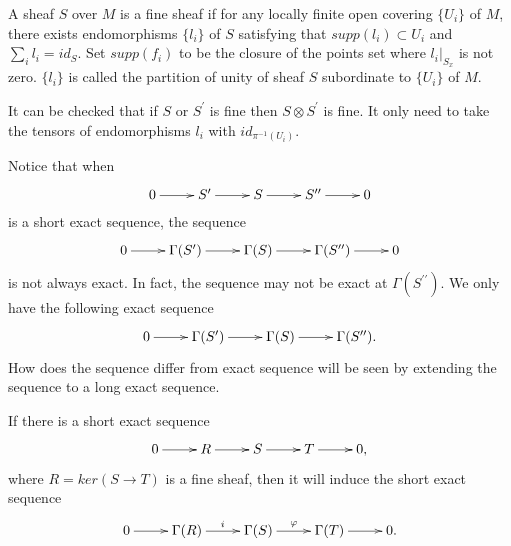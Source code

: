 \documentclass[twoside]{article}
\begin{document}
\begin{definition}
  A sheaf $S$ over $M$ is a fine sheaf if for any locally finite  open covering $\{U_i\}$ of $M$, there exists endomorphisms $\{l_i\}$   of $S$ satisfying that $supp(l_i)\subset U_i$ and $\sum_i l_i=id_S$. Set $supp(f_i)$ to be the closure of the points set where $l_i|_{S_x}$ is not zero. $\{l_i\}$ is called the partition of unity of sheaf $S$ subordinate to $\{U_i\}$ of $M$.

\end{definition}

It can be checked  that if $S$ or $S^\prime$ is fine then $S\otimes S^\prime$ is fine. It only need to  take the tensors of  endomorphisms $l_i$ with $id_{\pi^{-1}(U_i)}$.


Notice that when
\begin{equation*}
  \xymatrix{
  0\ar[r]&S^\prime\ar[r]&S\ar[r]&S^{\prime\prime}\ar[r]&0\\
  }
\end{equation*}
is a  short exact sequence, the sequence
  \begin{equation*}
  \xymatrix{
  0\ar[r]&\Gamma(S^\prime)\ar[r]&\Gamma(S)\ar[r]&\Gamma(S^{\prime\prime})\ar[r]&0\\
  }
\end{equation*}
is not always exact.
In fact, the sequence may not be exact at  $\Gamma(S^{\prime\prime})$.
We only have the following exact sequence
  \begin{equation*}
  \xymatrix{
  0\ar[r]&\Gamma(S^\prime)\ar[r]&\Gamma(S)\ar[r]&\Gamma(S^{\prime\prime}).\\
  }
\end{equation*}
 How does the sequence differ from exact sequence  will be seen by extending the sequence to a long exact sequence.


\begin{theorem}
  If there is a  short exact sequence \begin{equation*}
  \xymatrix{
  0\ar[r]&R\ar[r]&S\ar[r]&T\ar[r]&0,\\
  }
\end{equation*}
where $R=ker(S\to T)$ is a fine sheaf, then it will induce  the short exact sequence
\begin{equation*}
  \xymatrix{
  0\ar[r]&\Gamma(R)\ar[r]^i&\Gamma(S)\ar[r]^\varphi&\Gamma(T)\ar[r]&0.\\
  }
\end{equation*}

\end{theorem}
\end{document}
